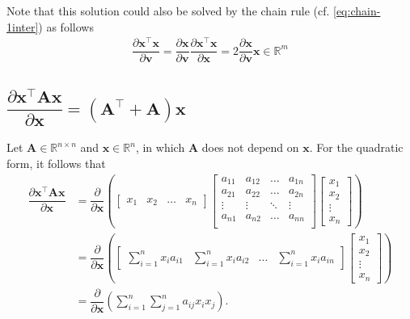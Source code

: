\documentclass{article}
\newcommand{\trans}{\top}
\begin{document}
Note that this solution could also be solved by the chain rule (cf. \eqref{eq:chain-1inter}) as follows
\begin{align}
    \boxed{\dfrac{\partial \mathbf{x}^\trans \mathbf{x}}{\partial \mathbf{v}} = \dfrac{\partial \mathbf{x}}{\partial \mathbf{v}} \dfrac{\partial \mathbf{x}^\trans \mathbf{x}}{\partial \mathbf{x}} = 2\dfrac{\partial \mathbf{x}}{\partial \mathbf{v}}\mathbf{x} \in \mathbb{R}^m}
\end{align}

\subsection{\(\dfrac{\partial \mathbf{x}^\trans \mathbf{A} \mathbf{x}}{\partial \mathbf{x}} = \left(\mathbf{A}^\trans + \mathbf{A}\right) \mathbf{x}\)}
Let \(\mathbf{A}\in \mathbb{R}^{n\times n}\) and \(\mathbf{x} \in \mathbb{R}^{n}\), in which \(\mathbf{A}\) does not depend on \(\mathbf{x}\). For the quadratic form, it follows that
\begin{align}
    \dfrac{\partial \mathbf{x}^\trans \mathbf{A} \mathbf{x}}{\partial \mathbf{x}} &= \dfrac{\partial}{\partial \mathbf{x}} \left(
    \begin{bmatrix}
        x_{1} & x_{2} & \dots & x_{n}
    \end{bmatrix}
    \begin{bmatrix}
        a_{11} & a_{12} & \dots & a_{1n} \\
        a_{21} & a_{22} & \dots & a_{2n} \\
        \vdots & \vdots & \ddots & \vdots \\
        a_{n1} & a_{n2} & \dots & a_{nn} \\
    \end{bmatrix} \begin{bmatrix}
        x_{1} \\ x_{2} \\ \vdots \\ x_{n}
    \end{bmatrix} \right) \\
    &= \dfrac{\partial}{\partial \mathbf{x}} \left(
			\begin{bmatrix}
				\displaystyle \sum_{i = 1}^{n} x_{i}a_{i1} & 
				\displaystyle \sum_{i = 1}^{n} x_{i}a_{i2} & 
				\dots & 
				\displaystyle \sum_{i = 1}^{n} x_{i}a_{in}
			\end{bmatrix} \begin{bmatrix}
				x_{1} \\ x_{2} \\ \vdots \\ x_{n}
			\end{bmatrix} \right) \\
            &= \dfrac{\partial}{\partial \mathbf{x}} \left(
				\sum_{i = 1}^{n}\sum_{j = 1}^{n} a_{ij} x_{i} x_{j}
			\right).
\end{align}
\end{document}
